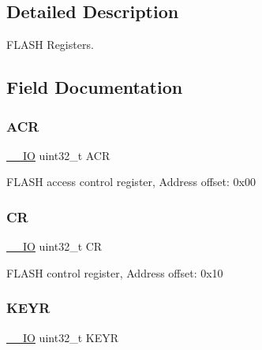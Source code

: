 \subsection{Detailed Description}
F\+L\+A\+SH Registers. 

\subsection{Field Documentation}
\mbox{\label{struct_f_l_a_s_h___type_def_a9cb55206b29a8c16354747c556ab8bea}} 
\subsubsection{\texorpdfstring{A\+CR}{ACR}}
{\footnotesize\ttfamily \mbox{\hyperlink{core__sc300_8h_aec43007d9998a0a0e01faede4133d6be}{\+\_\+\+\_\+\+IO}} uint32\+\_\+t A\+CR}

F\+L\+A\+SH access control register, Address offset\+: 0x00 \mbox{\label{struct_f_l_a_s_h___type_def_ab40c89c59391aaa9d9a8ec011dd0907a}} 
\subsubsection{\texorpdfstring{CR}{CR}}
{\footnotesize\ttfamily \mbox{\hyperlink{core__sc300_8h_aec43007d9998a0a0e01faede4133d6be}{\+\_\+\+\_\+\+IO}} uint32\+\_\+t CR}

F\+L\+A\+SH control register, Address offset\+: 0x10 \mbox{\label{struct_f_l_a_s_h___type_def_a84c491be6c66b1d5b6a2efd0740b3d0c}} 
\subsubsection{\texorpdfstring{K\+E\+YR}{KEYR}}
{\footnotesize\ttfamily \mbox{\hyperlink{core__sc300_8h_aec43007d9998a0a0e01faede4133d6be}{\+\_\+\+\_\+\+IO}} uint32\+\_\+t K\+E\+YR}

